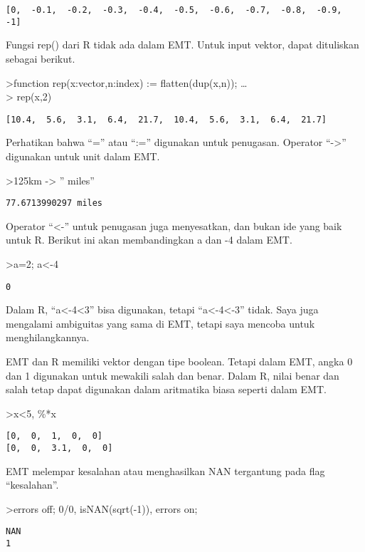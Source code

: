 \documentclass[
]{book}
\begin{document}
\begin{verbatim}
[0,  -0.1,  -0.2,  -0.3,  -0.4,  -0.5,  -0.6,  -0.7,  -0.8,  -0.9,  -1]
\end{verbatim}

Fungsi rep() dari R tidak ada dalam EMT. Untuk input vektor, dapat dituliskan sebagai berikut.

\textgreater function rep(x:vector,n:index) := flatten(dup(x,n)); \ldots{}\\
\textgreater{} rep(x,2)

\begin{verbatim}
[10.4,  5.6,  3.1,  6.4,  21.7,  10.4,  5.6,  3.1,  6.4,  21.7]
\end{verbatim}

Perhatikan bahwa ``='' atau ``:='' digunakan untuk penugasan. Operator ``-\textgreater{}'' digunakan untuk unit dalam EMT.

\textgreater125km -\textgreater{} '' miles''

\begin{verbatim}
77.6713990297 miles
\end{verbatim}

Operator ``\textless-'' untuk penugasan juga menyesatkan, dan bukan ide yang baik untuk R. Berikut ini akan membandingkan a dan -4 dalam EMT.

\textgreater a=2; a\textless-4

\begin{verbatim}
0
\end{verbatim}

Dalam R, ``a\textless-4\textless3'' bisa digunakan, tetapi ``a\textless-4\textless-3'' tidak. Saya juga mengalami ambiguitas yang sama di EMT, tetapi saya mencoba untuk menghilangkannya.

EMT dan R memiliki vektor dengan tipe boolean. Tetapi dalam EMT, angka 0 dan 1 digunakan untuk mewakili salah dan benar. Dalam R, nilai benar dan salah tetap dapat digunakan dalam aritmatika biasa seperti dalam EMT.

\textgreater x\textless5, \%*x

\begin{verbatim}
[0,  0,  1,  0,  0]
[0,  0,  3.1,  0,  0]
\end{verbatim}

EMT melempar kesalahan atau menghasilkan NAN tergantung pada flag ``kesalahan''.

\textgreater errors off; 0/0, isNAN(sqrt(-1)), errors on;

\begin{verbatim}
NAN
1
\end{verbatim}
\end{document}
